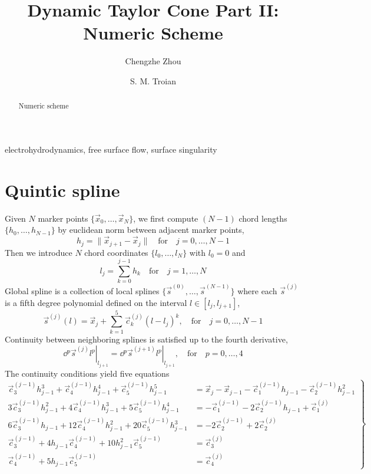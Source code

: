 \documentclass{jfm}
\title{Dynamic Taylor Cone Part II: Numeric Scheme}
\author{ Chengzhe Zhou\aff{1}
 \and S. M. Troian\aff{2}   \corresp{\email{stroian@caltech.edu}}}
\affiliation{\aff{1}Division of Physics, Mathematics and Astronomy, California Institute of Technology,
Pasadena, CA 91125, USA
\aff{2}Department of Applied Physics and Materials Science, 
California Institute of Technology,
Pasadena, CA 91125, USA}
\begin{document}
\maketitle
\begin{abstract}
Numeric scheme \citep{Taylor64}
\end{abstract}

\begin{keywords}
electrohydrodynamics, free surface flow, surface singularity 
\end{keywords}

\section{Quintic spline}
Given $N$ marker points $\{\vec{x}_0,\dots,\vec{x}_N\}$,
we first compute $(N-1)$ chord lengths $\{h_0,\dots,h_{N-1}\}$
by euclidean norm between adjacent marker points,
\begin{equation}
h_j=\|\vec{x}_{j+1}-\vec{x}_{j}\|\quad\textrm{for}\quad j=0,\dots,N-1
\end{equation}
Then we  introduce $N$ chord coordinates $\{l_0,\dots,l_N\}$ with $l_0=0$ and
\begin{equation}
l_j=\sum_{k=0}^{j-1}h_k\quad\textrm{for}\quad j=1,\dots,N
\end{equation}
Global spline is a collection of local splines $\{\vec{s}^{(0)},\dots,\vec{s}^{(N-1)}\}$
where each $\vec{s}^{(j)}$ is a fifth degree polynomial defined on the interval $l\in[l_j,l_{j+1}]$,
\begin{equation}
\vec{s}^{(j)}(l)=\vec{x}_j+\sum_{k=1}^{5}\vec{c}^{(j)}_k(l-l_j)^k,
\quad\textrm{for}\quad j=0,\dots,N-1
\end{equation}
Continuity between neighboring splines is satisfied up to the fourth derivative,
\begin{equation}
\left.\dd{^{p}\vec{s}^{(j)}}{l^p}\right|_{l_{j+1}}=
\left.\dd{^{p}\vec{s}^{(j+1)}}{l^p}\right|_{l_{j+1}},
\quad\textrm{for}\quad p=0,\dots,4
\end{equation}
The continuity conditions yield five equations
\begin{equation}\left.
\begin{aligned}
\vec{c}^{(j-1)}_3h_{j-1}^3+\vec{c}^{(j-1)}_4h_{j-1}^4+\vec{c}^{(j-1)}_5h_{j-1}^5
&=\vec{x}_j-\vec{x}_{j-1}-\vec{c}^{(j-1)}_1h_{j-1}-\vec{c}^{(j-1)}_2h_{j-1}^2\\
3\vec{c}^{(j-1)}_3h_{j-1}^2+4\vec{c}^{(j-1)}_4h_{j-1}^3+5\vec{c}^{(j-1)}_5h_{j-1}^4
&=-\vec{c}^{(j-1)}_1-2\vec{c}^{(j-1)}_2h_{j-1}+\vec{c}_1^{(j)}\\
6\vec{c}^{(j-1)}_3h_{j-1}+12\vec{c}^{(j-1)}_4h_{j-1}^2+20\vec{c}^{(j-1)}_5h_{j-1}^3
&=-2\vec{c}^{(j-1)}_2+2\vec{c}_2^{(j)}\\
\vec{c}_3^{(j-1)}+4 h_{j-1} \vec{c}_4^{(j-1)}+10 h_{j-1}^2 \vec{c}_5^{(j-1)}
&=\vec{c}_3^{(j)}\\
\vec{c}_4^{(j-1)}+5 h_{j-1} \vec{c}_5^{(j-1)}
&=\vec{c}_4^{(j)}
\end{aligned}\right\}
\end{equation}
\end{document}
